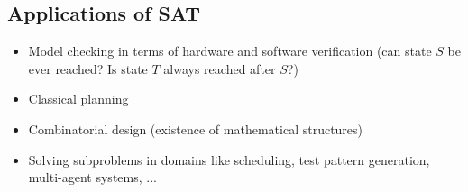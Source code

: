 \subsection{Applications of SAT}
\begin{itemize}
	\item Model checking in terms of hardware and software verification (can state $S$ be ever reached? Is state $T$ always reached after $S$?)
	\item Classical planning
	\item Combinatorial design (existence of mathematical structures)
	\item Solving subproblems in domains like scheduling, test pattern generation, multi-agent systems, ...
\end{itemize}